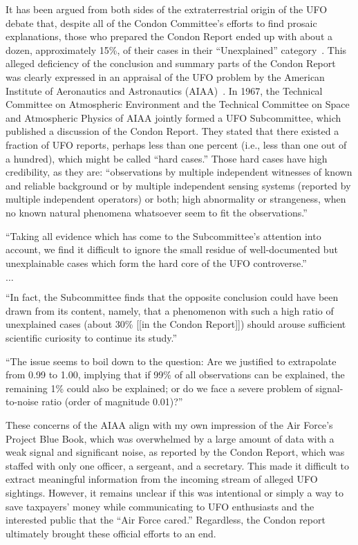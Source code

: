 It has been argued from both sides of the extraterrestrial origin of the UFO debate that,
despite all of the Condon Committee's efforts to find prosaic explanations, those who prepared the Condon Report
ended up with about a dozen, approximately 15{\%},
of their cases in their ``Unexplained'' category~\cite{Klass2019Apr,Hynek_1969,Page_1969,McDonald-Condon-69,Sturrock-Condon-87}.
This alleged deficiency of the conclusion and summary parts of the Condon Report was clearly expressed in an appraisal of the
UFO problem by the American Institute of Aeronautics and Astronautics (AIAA)~\cite{AA-Condon-1970}.
In 1967, the Technical Committee on Atmospheric Environment and the Technical Committee on Space and Atmospheric Physics of AIAA
jointly formed a UFO Subcommittee, which published a discussion of the Condon Report.
They stated that there existed a fraction of UFO reports, perhaps less than one percent (i.e., less than one out of a hundred),
which might be called ``hard cases.'' Those hard cases have high credibility, as they are:
``observations by multiple independent witnesses of known and reliable background or by multiple independent sensing systems
(reported by multiple independent operators) or both; high abnormality or strangeness,
when no known natural phenomena whatsoever seem to fit the observations.''
\begin{svgraybox}
``Taking all evidence which has come to the Subcommittee's attention into account,
we find it difficult to ignore the small residue of
well-documented but unexplainable cases which form the hard core of the UFO controverse.''

$\ldots$

``In fact, the Subcommittee finds that the opposite conclusion could have been drawn from its content, namely,
that a phenomenon with such a high ratio of unexplained cases (about 30{\%}
[[in the Condon Report]])
should arouse sufficient scientific curiosity to continue its study.''

``The issue seems to boil down to the question:
Are we justified to extrapolate from 0.99 to 1.00, implying that if 99{\%}
of all observations can be explained, the remaining 1{\%}
could also be explained; or do we face a severe problem of signal-to-noise ratio
(order of magnitude 0.01)?''
\end{svgraybox}

These concerns of the AIAA align with my own impression of the Air Force's Project Blue Book, which was overwhelmed by a large amount of data with a weak signal and significant noise, as reported by the Condon Report, which was staffed with only one officer, a sergeant, and a secretary. This made it difficult to extract meaningful information from the incoming stream of alleged UFO sightings. However, it remains unclear if this was intentional or simply a way to save taxpayers' money while communicating to UFO enthusiasts and the interested public that the ``Air Force cared.'' Regardless, the Condon report ultimately brought these official efforts to an end.


